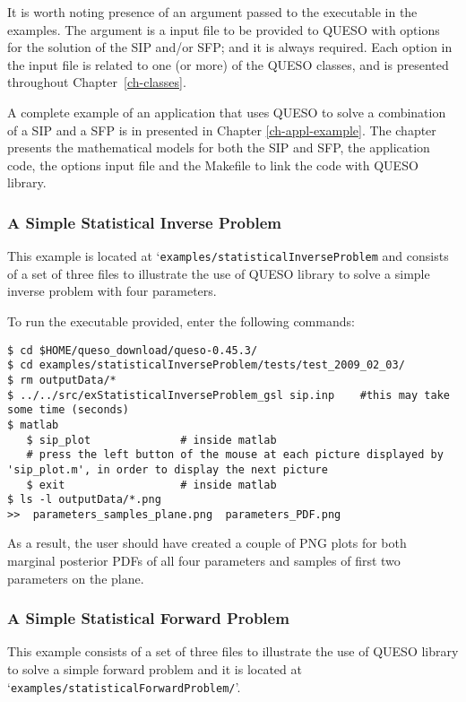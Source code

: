 It is worth noting presence of an argument passed to the executable in the examples. The argument is a input file to be provided to QUESO with options for the solution of the SIP and/or SFP; and it is always required. Each option in the input file is related to one (or more) of the QUESO classes, and is presented throughout Chapter~\ref{ch-classes}. 

A complete example of an application that uses QUESO to solve a combination of a SIP and a SFP is in presented in Chapter \ref{ch-appl-example}. The chapter presents the mathematical models for both the SIP and SFP, the application code, the options input file and the Makefile to link the code  with QUESO library.


\subsubsection{A Simple Statistical Inverse Problem}\label{sec:executable_sip}

This example is located at `\verb+examples/statisticalInverseProblem+ and consists of a set  of three files to illustrate the use of QUESO library to solve a simple inverse problem with four parameters.

To run the executable provided, enter the following commands:
\begin{lstlisting}[label={},caption={}]
$ cd $HOME/queso_download/queso-0.45.3/
$ cd examples/statisticalInverseProblem/tests/test_2009_02_03/
$ rm outputData/*
$ ../../src/exStatisticalInverseProblem_gsl sip.inp    #this may take some time (seconds)
$ matlab
   $ sip_plot	           # inside matlab
   # press the left button of the mouse at each picture displayed by 'sip_plot.m', in order to display the next picture
   $ exit	               # inside matlab
$ ls -l outputData/*.png
>>  parameters_samples_plane.png  parameters_PDF.png
\end{lstlisting}

As a result, the user should have created a couple of PNG plots for both marginal posterior PDFs of all four parameters and samples of first two parameters on the plane.

\subsubsection{A Simple Statistical Forward Problem}

This example consists of a set of three files to illustrate the use of QUESO library to solve a simple forward problem and it is located at `\texttt{examples/statisticalForwardProblem/}'. %

